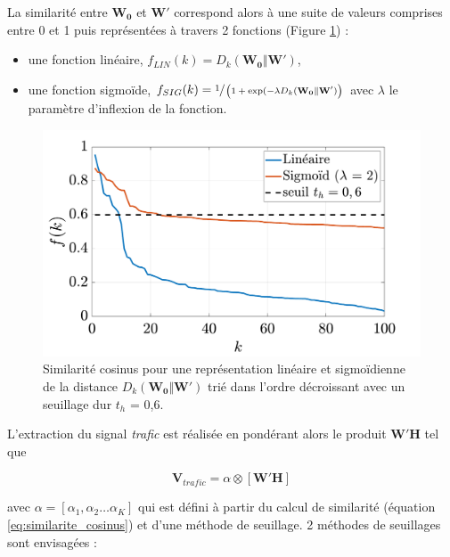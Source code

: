 La similarité entre $\mathbf{W_0}$ et $\mathbf{W'}$ correspond alors à une suite de valeurs comprises entre 0 et 1 puis représentées à travers 2 fonctions (Figure \ref{fig:resume_simil}) :

\begin{itemize}
\item une fonction linéaire, $f_{LIN}(k) = D_{k}(\mathbf{W_0} \Vert \mathbf{W'})$,
\item une fonction sigmoïde, $f_{SIG}(k) = \sfrac{1}{\left(1+\exp({-\lambda D_{k}(\mathbf{W_0} \Vert \mathbf{W'})}\right)}$ avec $\lambda$ le paramètre d'inflexion de la fonction.\\
\end{itemize}

\begin{figure}
    \centering
    \includegraphics[width=0.7\linewidth]{./figures/NMF/lin_sig.pdf}
    \caption{Similarité cosinus pour une représentation linéaire et sigmoïdienne de la distance $D_{k}(\mathbf{W_0} \Vert \mathbf{W'})$ trié dans l'ordre décroissant avec un seuillage dur $t_h$ = 0,6. }
    \label{fig:resume_simil}
\end{figure}

L'extraction du signal \textit{trafic} est réalisée en pondérant alors le produit $\mathbf{W'H}$ tel que

\begin{equation}
\mathbf{V}_{trafic} = \alpha \otimes \left[\mathbf{W'H} \right]
\end{equation}

avec $\alpha = \left[\alpha_1, \alpha_2 \dots \alpha_K \right]$ qui est défini à partir du calcul de similarité (équation \ref{eq:similarite_cosinus}) et d'une méthode de seuillage. 2 méthodes de seuillages sont envisagées :

